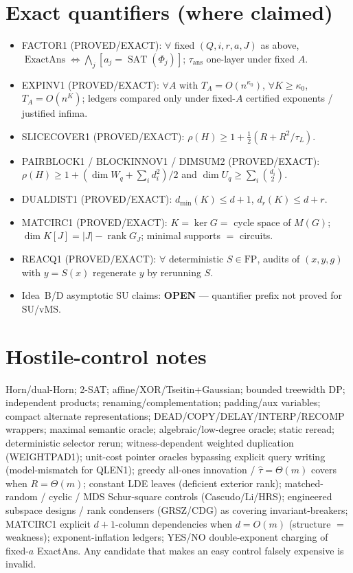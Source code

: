 \documentclass[11pt]{article}
\begin{document}
\section*{Exact quantifiers (where claimed)}
\begin{itemize}
\item FACTOR1 (PROVED/EXACT): $\forall$ fixed $(Q,i,r,a,J)$ as above,
$\operatorname{ExactAns}\iff\bigwedge_j[a_j=\operatorname{SAT}(\Phi_j)]$;
$\tau_{\mathrm{ans}}$ one-layer under fixed $A$.
\item EXPINV1 (PROVED/EXACT): $\forall A$ with $T_A=O(n^{\kappa_0})$, $\forall K\ge\kappa_0$,
$T_A=O(n^K)$; ledgers compared only under fixed-$A$ certified exponents / justified infima.
\item SLICECOVER1 (PROVED/EXACT): $\rho(H)\ge 1+\tfrac12(R+R^2/\tau_L)$.
\item PAIRBLOCK1 / BLOCKINNOV1 / DIMSUM2 (PROVED/EXACT):
$\rho(H)\ge 1+(\dim W_q+\sum_i d_i^2)/2$ and $\dim U_q\ge\sum_i\binom{d_i}{2}$.
\item DUALDIST1 (PROVED/EXACT): $d_{\min}(K)\le d+1$, $d_r(K)\le d+r$.
\item MATCIRC1 (PROVED/EXACT): $K=\ker G=$ cycle space of $M(G)$;
$\dim K[J]=|J|-\operatorname{rank}G_J$; minimal supports $=$ circuits.
\item REACQ1 (PROVED/EXACT): $\forall$ deterministic $S\in\mathrm{FP}$, audits of $(x,y,g)$
with $y=S(x)$ regenerate $y$ by rerunning $S$.
\item Idea~B/D asymptotic SU claims: \textbf{OPEN} --- quantifier prefix not proved for SU/vMS.
\end{itemize}

\section*{Hostile-control notes}
Horn/dual-Horn; 2-SAT; affine/XOR/Tseitin+Gaussian; bounded treewidth DP; independent products;
renaming/complementation; padding/aux variables; compact alternate representations;
DEAD/COPY/DELAY/INTERP/RECOMP wrappers; maximal semantic oracle; algebraic/low-degree oracle;
static reread; deterministic selector rerun; witness-dependent weighted duplication (WEIGHTPAD1);
unit-cost pointer oracles bypassing explicit query writing (model-mismatch for QLEN1);
greedy all-ones innovation / $\widehat\tau=\Theta(m)$ covers when $R=\Theta(m)$;
constant LDE leaves (deficient exterior rank);
matched-random / cyclic / MDS Schur-square controls (Cascudo/Li/HRS);
engineered subspace designs / rank condensers (GRSZ/CDG) as covering invariant-breakers;
MATCIRC1 explicit $d+1$-column dependencies when $d=O(m)$ (structure $=$ weakness);
exponent-inflation ledgers; YES/NO double-exponent charging of fixed-$a$ ExactAns.
Any candidate that makes an easy control falsely expensive is invalid.
\end{document}
